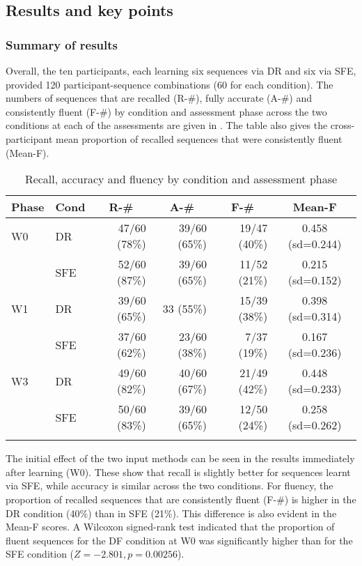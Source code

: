 \documentclass[output=paper]{langscibook}
\begin{document}
\subsection{Results and key points}
\subsubsection{Summary of results}


Overall, the ten participants, each learning six sequences via DR and six via SFE, provided 120 participant-sequence combinations (60 for each condition). The numbers of sequences that are recalled (R-\#), fully accurate (A-\#) and consistently fluent (F-\#) by condition and assessment phase across the two conditions at each of the assessments are given in .  The table also gives the cross-participant mean proportion of recalled sequences that were consistently fluent (Mean-F).

\begin{table}
\begin{tabular}{llrrrc}
\lsptoprule
Phase & Cond & \multicolumn{1}{c}{R-\#} & \multicolumn{1}{c}{A-\#} & \multicolumn{1}{c}{F-\#} & Mean-F\\\midrule
W0  & {DR}  & {47/60 (78\%)} & {39/60 (65\%)} & {19/47 (40\%)} & {0.458 (sd=0.244)}\\
    & {SFE}  & {52/60 (87\%)} & {39/60 (65\%)} & {11/52 (21\%)} & {0.215 (sd=0.152)}\\
W1  & {DR}  & {39/60 (65\%)} & {33 (55\%)} & {15/39 (38\%)} & {0.398 (sd=0.314)}\\
    & {SFE}  & {37/60 (62\%)} & {23/60 (38\%)} & { 7/37 (19\%)} & {0.167 (sd=0.236)}\\
W3  & {DR} & {49/60 (82\%)} & {40/60 (67\%)} & {21/49 (42\%)} & {0.448 (sd=0.233)}\\
    & {SFE}  & {50/60 (83\%)} & {39/60 (65\%)} & {12/50 (24\%)} & {0.258 (sd=0.262)}\\
\lspbottomrule
\end{tabular}
\caption{Recall, accuracy and fluency by condition and assessment phase\label{tab:cutler:3}}
\end{table}


The initial effect of the two input methods can be seen in the results immediately after learning (W0). These show that recall is slightly better for sequences learnt via SFE, while accuracy is similar across the two conditions. For fluency, the proportion of recalled sequences that are consistently fluent (F-\#) is higher in the DR condition (40\%) than in SFE (21\%). This difference is also evident in the Mean-F scores.  A Wilcoxon signed-rank test indicated that the proportion of fluent sequences for the DF condition at W0 was significantly higher than for the SFE condition ($Z=-2.801, p=0.00256$).
\end{document}
